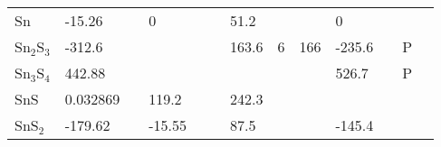 \begin{landscape}
\begin{center}
\begin{longtable}{|l|p{2.5cm}|l|p{2.5cm}|l|l|p{2.5cm}|l|l|p{2.5cm}|l|l|l|}
Sn               	   & -15.26                     & \citep{Barin1977} & 0                   &     & \citep{Haynes2013}     & 51.2               &     & \citep{Haynes2013} & 0                                   &     & \citep{Haynes2013} &  \\
Sn$_2$S$_3$        	   & -312.6                     & \citep{Barin1977} &                     &     &         & 163.6              & 6   & 166 & -235.6                              &     & P   &  \\
Sn$_3$S$_4$        	   & 442.88                     & \citep{Barin1977} &                     &     &         &                    &     &     & 526.7                               &     & P   &  \\
SnS              	   & 0.032869                   & \citep{Barin1977} & 119.2               &     & \citep{Wagman1982}     & 242.3              &     & 
\citep{Hellwege1984} &                                     &     &     &  \\
SnS$_2$           	   & -179.62                    & \citep{Barin1977} & -15.55              &     & \citep{Jackson1985}     & 87.5               &     & \citep{Jackson1985} & -145.4                            &     & \citep{Jackson1985} &  \\

\end{longtable}
\end{center}
\end{landscape}
